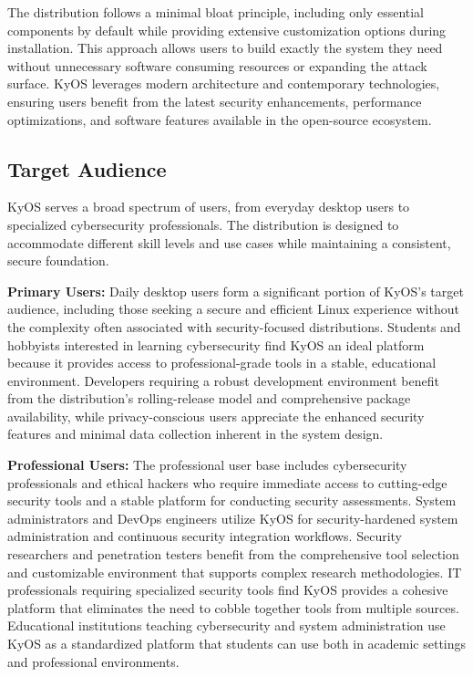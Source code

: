 \documentclass[12pt,a4paper]{article}
\begin{document}
The distribution follows a minimal bloat principle, including only essential components by default while providing extensive customization options during installation. This approach allows users to build exactly the system they need without unnecessary software consuming resources or expanding the attack surface. KyOS leverages modern architecture and contemporary technologies, ensuring users benefit from the latest security enhancements, performance optimizations, and software features available in the open-source ecosystem.

\subsection{Target Audience}
KyOS serves a broad spectrum of users, from everyday desktop users to specialized cybersecurity professionals. The distribution is designed to accommodate different skill levels and use cases while maintaining a consistent, secure foundation.

\textbf{Primary Users:}
Daily desktop users form a significant portion of KyOS's target audience, including those seeking a secure and efficient Linux experience without the complexity often associated with security-focused distributions. Students and hobbyists interested in learning cybersecurity find KyOS an ideal platform because it provides access to professional-grade tools in a stable, educational environment. Developers requiring a robust development environment benefit from the distribution's rolling-release model and comprehensive package availability, while privacy-conscious users appreciate the enhanced security features and minimal data collection inherent in the system design.

\textbf{Professional Users:}
The professional user base includes cybersecurity professionals and ethical hackers who require immediate access to cutting-edge security tools and a stable platform for conducting security assessments. System administrators and DevOps engineers utilize KyOS for security-hardened system administration and continuous security integration workflows. Security researchers and penetration testers benefit from the comprehensive tool selection and customizable environment that supports complex research methodologies. IT professionals requiring specialized security tools find KyOS provides a cohesive platform that eliminates the need to cobble together tools from multiple sources. Educational institutions teaching cybersecurity and system administration use KyOS as a standardized platform that students can use both in academic settings and professional environments.
\end{document}
